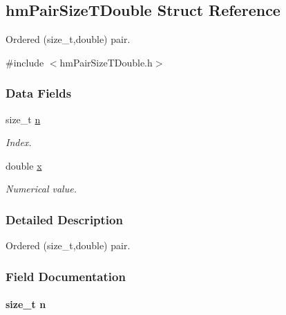 \hypertarget{structhm_pair_size_t_double}{\subsection{hm\-Pair\-Size\-T\-Double Struct Reference}
\label{structhm_pair_size_t_double}
}


Ordered (size\-\_\-t,double) pair.  




{\ttfamily \#include $<$hm\-Pair\-Size\-T\-Double.\-h$>$}

\subsubsection*{Data Fields}
\begin{DoxyCompactItemize}
\item 
size\-\_\-t \hyperlink{structhm_pair_size_t_double_a3d05cf6aa68b03e254d70afbe869e305}{n}
\begin{DoxyCompactList}\small\item\em Index. \end{DoxyCompactList}\item 
double \hyperlink{structhm_pair_size_t_double_af88b946fb90d5f08b5fb740c70e98c10}{x}
\begin{DoxyCompactList}\small\item\em Numerical value. \end{DoxyCompactList}\end{DoxyCompactItemize}


\subsubsection{Detailed Description}
Ordered (size\-\_\-t,double) pair. 

\subsubsection{Field Documentation}
\hypertarget{structhm_pair_size_t_double_a3d05cf6aa68b03e254d70afbe869e305}{
\paragraph[{n}]{\setlength{\rightskip}{0pt plus 5cm}size\-\_\-t n}}\label{structhm_pair_size_t_double_a3d05cf6aa68b03e254d70afbe869e305}


